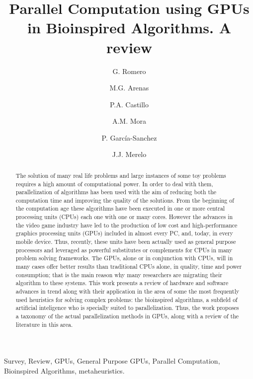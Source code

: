 \documentclass[review]{elsarticle}
\begin{document}
\begin{frontmatter}


\title{Parallel Computation using GPUs in Bioinspired Algorithms. A review}

\author{G. Romero}
\author{M.G. Arenas}
\author{P.A. Castillo}
\author{A.M. Mora}
\author{P. García-Sanchez}
\author{J.J. Merelo}
\address{University of Granada}

\begin{abstract}
The solution of many real life problems and large instances of some
toy problems requires a high amount of computational power. In order
to deal with them, parallelization of algorithms has been used with
the aim of reducing both the computation time and improving the
quality of the solutions. From the beginning of the computation age
these algorithms have been executed in one or more central processing units
(CPUs) each one with one or many cores. However the advances in the video game industry have led to the production of low cost and high-performance graphics processing units (GPUs) included in almost every PC, and, today, in every mobile
device. Thus, recently, these units have been actually used as general
purpose processors and leveraged as powerful substitutes or complements for CPUs in many problem solving frameworks.
The GPUs, alone or in conjunction with CPUs, will in many cases offer better results than traditional CPUs alone, in quality, time and power consumption; that
is the main reason why many researchers are migrating their algorithm to these systems. This work presents a review of hardware and software advances in trend 
along with their application in the area of some the most frequently
used heuristics for solving complex problems: the bioinspired
algorithms, a subfield of artificial inteligence who is specially suited to parallelization. Thus, the work proposes a taxonomy of the actual parallelization methods in GPUs, along with a review of the literature in this area.
\end{abstract}

\begin{keyword}
Survey, Review, GPUs, General Purpose GPUs, Parallel Computation,
Bioinspired Algorithms, metaheuristics.
\end{keyword}

\end{frontmatter}
\end{document}
